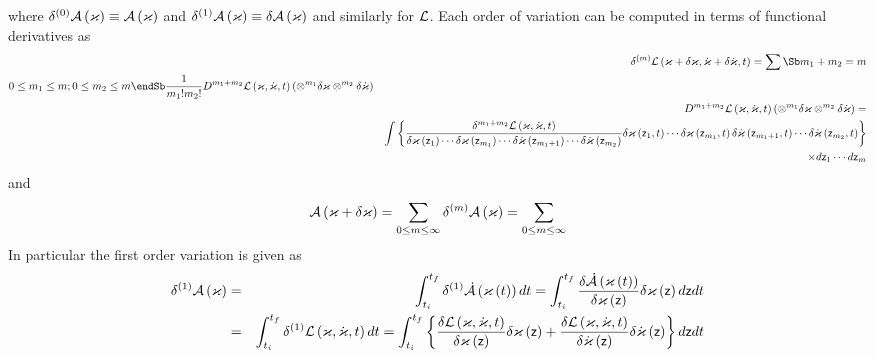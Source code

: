 where $\delta ^{\left( 0\right) }{\cal A}\left( \varkappa \right) \equiv 
{\cal A}\left( \varkappa \right) $ and $\delta ^{\left( 1\right) }{\cal A}%
\left( \varkappa \right) \equiv \delta {\cal A}\left( \varkappa \right) $
and similarly for ${\cal L}$. Each order of variation can be computed in
terms of functional derivatives as 
\begin{eqnarray}
&&\delta ^{\left( m\right) }{\cal L}\left( \varkappa +\delta \varkappa ,\dot{%
\varkappa}+\delta \dot{\varkappa},t\right) =\sum\Sb m_{1}+m_{2}=m  \\ 0\leq
m_{1}\leq m;0\leq m_{2}\leq m  \endSb \frac{1}{m_{1}!m_{2}!}D^{m_{1}+m_{2}}%
{\cal L}\left( \varkappa ,\dot{\varkappa},t\right) \left( \otimes
^{m_{1}}\delta \varkappa \otimes ^{m_{2}}\delta \dot{\varkappa}\right) 
\nonumber \\
&&D^{m_{1}+m_{2}}{\cal L}\left( \varkappa ,\dot{\varkappa},t\right) \left(
\otimes ^{m_{1}}\delta \varkappa \otimes ^{m_{2}}\delta \dot{\varkappa}%
\right) =  \nonumber \\
&&\int \left\{ \frac{\delta ^{m_{1}+m_{2}}{\cal L}\left( \varkappa ,\dot{%
\varkappa},t\right) }{\delta \varkappa \left( {\sf z}_{1}\right) \cdots
\delta \varkappa \left( {\sf z}_{m_{1}}\right) \cdots \delta \dot{\varkappa}%
\left( {\sf z}_{m_{1}+1}\right) \cdots \delta \dot{\varkappa}\left( {\sf z}%
_{m_{2}}\right) }\delta \varkappa \left( {\sf z}_{1},t\right) \cdots \delta
\varkappa \left( {\sf z}_{m_{1}},t\right) \delta \dot{\varkappa}\left( {\sf z%
}_{m_{1}+1},t\right) \cdots \delta \dot{\varkappa}\left( {\sf z}%
_{m_{2}},t\right) \right\}  \nonumber \\
&&\qquad \qquad \qquad \qquad \qquad \qquad \qquad \qquad \qquad \qquad
\qquad \qquad \qquad \qquad \qquad \qquad \qquad \qquad \times d{\sf z}%
_{1}\cdots d{\sf z}_{m}
\end{eqnarray}%
and 
\begin{equation}
{\cal A}\left( \varkappa +\delta \varkappa \right) =\sum_{0\leq m\leq \infty
}\delta ^{\left( m\right) }{\cal A}\left( \varkappa \right) =\sum_{0\leq
m\leq \infty }
\end{equation}%
In particular the first order variation is given as 
\begin{eqnarray}
\delta ^{\left( 1\right) }{\cal A}\left( \varkappa \right)
&=&\int_{t_{i}}^{t_{f}}\delta ^{\left( 1\right) }{\cal \dot{A}}\left(
\varkappa \left( t\right) \right) dt=\int_{t_{i}}^{t_{f}}\frac{\delta {\cal 
\dot{A}}\left( \varkappa \left( t\right) \right) }{\delta \varkappa \left( 
{\sf z}\right) }\delta \varkappa \left( {\sf z}\right) d{\sf z}dt  \label{A1}
\\
&=&\int_{t_{i}}^{t_{f}}\delta ^{\left( 1\right) }{\cal L}\left( \varkappa ,%
\dot{\varkappa},t\right) dt=\int_{t_{i}}^{t_{f}}\left\{ \frac{\delta {\cal L}%
\left( \varkappa ,\dot{\varkappa},t\right) }{\delta \varkappa \left( {\sf z}%
\right) }\delta \varkappa \left( {\sf z}\right) +\frac{\delta {\cal L}\left(
\varkappa ,\dot{\varkappa},t\right) }{\delta \dot{\varkappa}\left( {\sf z}%
\right) }\delta \dot{\varkappa}\left( {\sf z}\right) \right\} d{\sf z}dt
\label{L1}
\end{eqnarray}%
